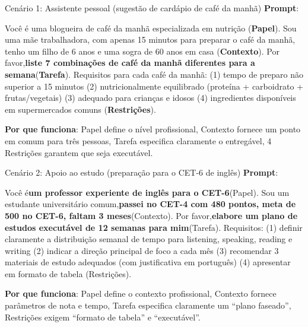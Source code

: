 \begin{tcbinfo}{Cenário 1: Assistente pessoal (sugestão de cardápio de café da manhã)}
\textbf{Prompt}:

Você é uma blogueira de café da manhã especializada em nutrição (\textbf{Papel}). Sou uma mãe trabalhadora, com apenas 15 minutos para preparar o café da manhã, tenho um filho de 6 anos e uma sogra de 60 anos em casa (\textbf{Contexto}). Por favor,\textbf{liste 7 combinações de café da manhã diferentes para a semana}(\textbf{Tarefa}). Requisitos para cada café da manhã: (1) tempo de preparo não superior a 15 minutos (2) nutricionalmente equilibrado (proteína + carboidrato + frutas/vegetais) (3) adequado para crianças e idosos (4) ingredientes disponíveis em supermercados comuns (\textbf{Restrições}).

\textbf{Por que funciona}: Papel define o nível profissional, Contexto fornece um ponto em comum para três pessoas, Tarefa especifica claramente o entregável, 4 Restrições garantem que seja executável.

\end{tcbinfo}

\begin{tcbinfo}{Cenário 2: Apoio ao estudo (preparação para o CET-6 de inglês)}
\textbf{Prompt}:

Você é\textbf{um professor experiente de inglês para o CET-6}(Papel). Sou um estudante universitário comum,\textbf{passei no CET-4 com 480 pontos, meta de 500 no CET-6, faltam 3 meses}(Contexto). Por favor,\textbf{elabore um plano de estudos executável de 12 semanas para mim}(Tarefa). Requisitos: (1) definir claramente a distribuição semanal de tempo para listening, speaking, reading e writing (2) indicar a direção principal de foco a cada mês (3) recomendar 3 materiais de estudo adequados (com justificativa em português) (4) apresentar em formato de tabela (Restrições).

\textbf{Por que funciona}: Papel define o contexto profissional, Contexto fornece parâmetros de nota e tempo, Tarefa especifica claramente um “plano faseado”, Restrições exigem “formato de tabela” e “executável”.

\end{tcbinfo}

